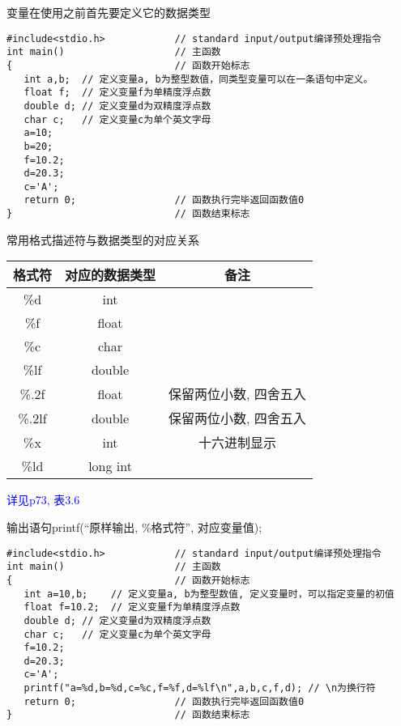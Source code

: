 \begin{frame}[fragile]{变量在使用之前首先要定义它的数据类型}
\begin{lstlisting}
#include<stdio.h>            // standard input/output编译预处理指令
int main()                   // 主函数
{                            // 函数开始标志
   int a,b;  // 定义变量a, b为整型数值，同类型变量可以在一条语句中定义。
   float f;  // 定义变量f为单精度浮点数
   double d; // 定义变量d为双精度浮点数
   char c;   // 定义变量c为单个英文字母
   a=10;
   b=20;
   f=10.2;
   d=20.3;
   c='A';
   return 0;                 // 函数执行完毕返回函数值0
}                            // 函数结束标志
\end{lstlisting}
\end{frame}

\begin{frame}{常用格式描述符与数据类型的对应关系}
\begin{tabular}{|c|c|c|}
	\hline 
	\textbf{格式符} & \textbf{对应的数据类型} &  \textbf{备注}\\ 
	\hline 
	\%d & int &  \\ 
	\hline  
	\%f & float &  \\
	\hline  
	\%c & char & \\ 
	\hline  
	\%lf & double & \\ 
	\hline 
	\%.2f & float & 保留两位小数, 四舍五入 \\ 
	\hline 
	\%.2lf & double & 保留两位小数, 四舍五入 \\ 
	\hline
	\hline   
	\%x & int & 十六进制显示 \\ 
	\hline 
	\%ld & long int &  \\ 
	\hline 
\end{tabular}
\newline
\newline
\textcolor{blue}{详见p73, 表3.6}
\end{frame}

\begin{frame}[fragile]{输出语句printf(``原样输出, \%格式符'', 对应变量值);}
\begin{lstlisting}
#include<stdio.h>            // standard input/output编译预处理指令
int main()                   // 主函数
{                            // 函数开始标志
   int a=10,b;    // 定义变量a, b为整型数值, 定义变量时，可以指定变量的初值
   float f=10.2;  // 定义变量f为单精度浮点数
   double d; // 定义变量d为双精度浮点数
   char c;   // 定义变量c为单个英文字母
   f=10.2;
   d=20.3;
   c='A';
   printf("a=%d,b=%d,c=%c,f=%f,d=%lf\n",a,b,c,f,d); // \n为换行符
   return 0;                 // 函数执行完毕返回函数值0
}                            // 函数结束标志
\end{lstlisting}
\end{frame}


